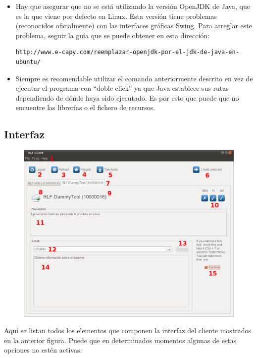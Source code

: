 \begin{itemize}
\item Hay que asegurar que no se está utilizando la versión OpenJDK 
de Java, que es la que viene por defecto en Linux. Esta versión tiene 
problemas (reconocidos oficialmente) con las interfaces gráficas Swing. 
Para arreglar este problema, seguir la guía que se puede obtener en 
esta dirección:
\begin{verbatim}
http://www.e-capy.com/reemplazar-openjdk-por-el-jdk-de-java-en-ubuntu/
\end{verbatim}

\item Siempre es recomendable utilizar el comando anteriormente 
descrito en vez de ejecutar el programa con ``doble click'' ya que 
Java establece sus rutas dependiendo de dónde haya sido ejecutado. Es 
por esto que puede que no encuentre las librerías o el fichero de 
recursos.
\end{itemize}

\clearpage

\subsection*{Interfaz}

\begin{figure}[H]
	\centering
	\includegraphics[scale=0.45]{images/user/screen.png}
\end{figure}

Aquí se listan todos los elementos que componen la interfaz del 
cliente mostrados en la anterior figura. Puede que en determinados 
momentos algunas de estas opciones no estén activas.

